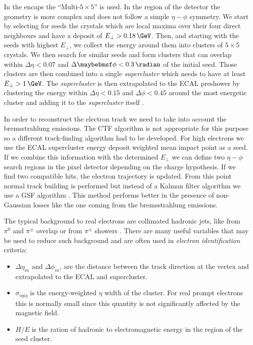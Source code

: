 In the encaps the ``$\text{Multi-}5 \times 5$'' is used. In the region of the detector the geometry is more complex and does not follow a simple $\eta-\phi$ symmetry. We start by selecting for seeds the crystals which are local maxima over their four direct neighbours and have a deposit of $E_\perp>0.18\,\GeV$. Then, and starting with the seeds with highest $E_\perp$, we collect the energy around them into clusters of $5 \times 5$ crystals. We then search for similar seeds and form clusters that can overlap within $\Delta\eta<0.07$ and $\Delta\phi<0.3\,\radian$ of the initial seed. Those clusters are then combined into a single \textit{supercluster} which needs to have at least $E_\perp>1\,\GeV$. The \textit{supercluster} is then extrapolated to the \gls{ECAL} preshower
by clustering the energy within $\Delta\eta<0.15$ and $\Delta\phi<0.45$ around the most energetic cluster and adding it to the \textit{supercluster} itself \cite{ARTICLE:CMSElectronReconstruction8TeV}.

In order to reconstruct the electron track we need to take into account the bremsstrahlung emissions. The \gls{CTF} algorithm is not appropriate for this purpose so a different track-finding algorithm had to be developed. For high \pt electrons we use the \gls{ECAL} supercluster energy deposit weighted mean impact point as a seed. If we combine this information with the determined $E_\perp$ we can define two $\eta-\phi$ search regions in the pixel detector depending on the charge hypothesis. If we find two compatible hits, the electron trajectory is updated. From this point normal track building is performed but instead of a Kalman filter algorithm we use a \gls{GSF} algorithm \cite{ARTICLE:CMSReconstructionElectronsGSF}. This method performs better in the presence of non-Gaussian losses like the one coming from the bremsstrahlung emissions.

The typical background to real electrons are collimated hadronic jets, like from $\pi^0$ and $\pi^{\pm}$ overlap or from $\pi^{\pm}$ showers \cite{ARTICLE:CMSElectronReconstruction}. There are many useful variables that may be used to reduce such background and are often used in \textit{electron identification} criteria:

\begin{itemize}
  \item $\Delta\eta_{in}$ and $\Delta\phi_{in}$, are the distance between the track direction at the vertex and extrapolated to the \gls{ECAL} and supercluster.
  \item $\sigma_{i \eta i \eta}$ is the energy-weighted $\eta$ width of the cluster. For real prompt electrons this is normally small since this quantity is not significantly affected by the magnetic field.
  \item $H/E$ is the ration of hadronic to electromagnetic energy in the region of the seed cluster. 
\end{itemize}

